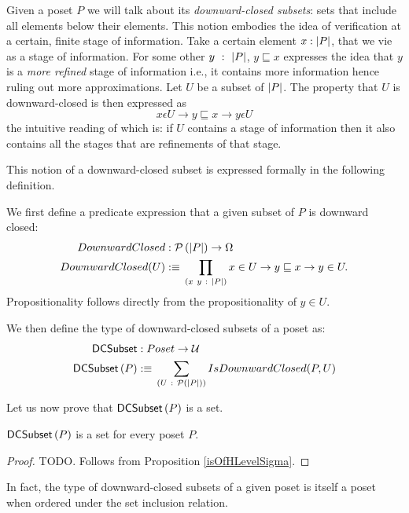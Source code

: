 Given a poset $P$ we will talk about its \emph{downward-closed subsets}: sets that include
all elements below their elements. This notion embodies the idea of verification at a
certain, finite stage of information. Take a certain element $x : \left| P \right|$, that we vie as
a stage of information. For some other $y~:~\left| P \right|$, $y \sqsubseteq x$ expresses the idea that $y$
is a \emph{more refined} stage of information i.e., it contains more information hence
ruling out more approximations. Let $U$ be a subset of $\left| P \right|$. The property that $U$
is downward-closed is then expressed as
\begin{equation*}
  x \epsilon U \rightarrow y \sqsubseteq x \rightarrow y \epsilon U
\end{equation*}
the intuitive reading of which is: if $U$ contains a stage of information then it also
contains all the stages that are refinements of that stage.

This notion of a downward-closed subset is expressed formally in the following
definition.
\begin{defn}
  We first define a predicate expression that a given subset of $P$ is downward closed:
  \begin{align*}
    DownwardClosed    &:  \mathcal{P}\left(\left| P \right|\right) \rightarrow \Omega\\
    DownwardClosed(U) &:\equiv{} \prod_{(x~y~:~\left| P \right|)} x \in U \rightarrow y \sqsubseteq x \rightarrow y \in U.
  \end{align*}
  Propositionality follows directly from the propositionality of $y \in U$.

  We then define the type of downward-closed subsets of a poset as:
  \begin{align*}
    \mathsf{DCSubset}{} &: Poset \rightarrow  \mathcal{U}\\
    \mathsf{DCSubset}{}\left(P\right)  &:\equiv{} \sum_{(U~:~\mathcal{P}\left(\left| P \right|\right))} IsDownwardClosed(P, U)
  \end{align*}
\end{defn}

Let us now prove that $\mathsf{DCSubset}{}\left(P\right)$ is a set.
\begin{prop}\label{isSetDCSubset}
  $\mathsf{DCSubset}{}\left(P\right)$ is a set for every poset $P$.
\end{prop}
\begin{proof}
  TODO.
  Follows from Proposition \ref{isOfHLevelSigma}.
\end{proof}

In fact, the type of downward-closed subsets of a given poset is itself a poset
when ordered under the set inclusion relation.

